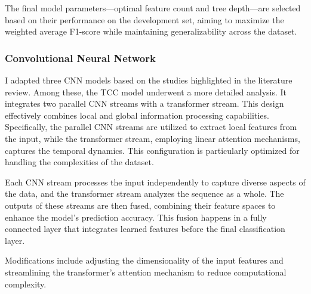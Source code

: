 The final model parameters—optimal feature count and tree depth—are selected based on their performance on the development set, aiming to maximize the weighted average F1-score while maintaining generalizability across the dataset.

\subsubsection{Convolutional Neural Network}

I adapted three CNN models based on the studies highlighted in the literature review. Among these, the TCC model underwent a more detailed analysis. It integrates two parallel CNN streams with a transformer stream. This design effectively combines local and global information processing capabilities. Specifically, the parallel CNN streams are utilized to extract local features from the input, while the transformer stream, employing linear attention mechanisms, captures the temporal dynamics. This configuration is particularly optimized for handling the complexities of the dataset.

Each CNN stream processes the input independently to capture diverse aspects of the data, and the transformer stream analyzes the sequence as a whole. The outputs of these streams are then fused, combining their feature spaces to enhance the model's prediction accuracy. This fusion happens in a fully connected layer that integrates learned features before the final classification layer.

Modifications include adjusting the dimensionality of the input features and streamlining the transformer's attention mechanism to reduce computational complexity.

